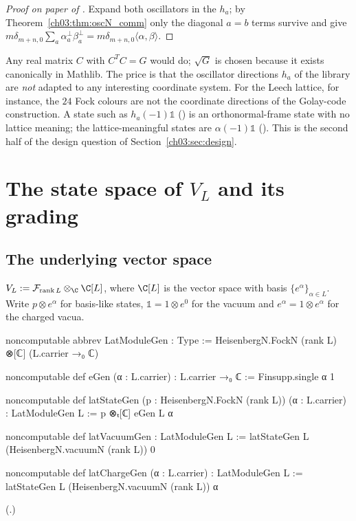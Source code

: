 \begin{proof}[Proof on paper of ]
Expand both oscillators in the $h_a$; by Theorem~\ref{ch03:thm:oscN_comm} only the diagonal
$a=b$ terms survive and give $m\delta_{m+n,0}\sum_a\alpha_a^\perp\beta_a^\perp=m\delta_{m+n,0}
\langle\alpha,\beta\rangle$.
\end{proof}

\begin{remark}\label{ch03:rem:sqrtG}
Any real matrix $C$ with $C^TC=G$ would do; $\sqrt G$ is chosen because it exists canonically in
Mathlib. The price is that the oscillator directions $h_a$ of the library are \emph{not} adapted
to any interesting coordinate system. For the Leech lattice, for instance, the $24$ Fock colours
are not the coordinate directions of the Golay-code construction. A state such as
$h_a(-1)\mathbb 1$ () is an orthonormal-frame state with no lattice meaning; the
lattice-meaningful states are $\alpha(-1)\mathbb 1$ (). This is the second half of the
design question of Section~\ref{ch03:sec:design}.
\end{remark}

\section{The state space of \texorpdfstring{$V_L$}{V\_L} and its grading}\label{ch03:sec:latticespace}

\subsection{The underlying vector space}

\begin{definition}\label{ch03:def:LatModuleGen}
$V_L:=\mathcal F_{\operatorname{rank}L}\otimes_{\C}\C[L]$, where $\C[L]$ is the vector space with
basis $\{e^\alpha\}_{\alpha\in L}$. Write $p\otimes e^\alpha$ for basis-like states, $\mathbb 1=
1\otimes e^0$ for the vacuum and $e^\alpha=1\otimes e^\alpha$ for the charged vacua.
\end{definition}
\begin{leancode}
noncomputable abbrev LatModuleGen : Type :=
  HeisenbergN.FockN (rank L) ⊗[ℂ] (L.carrier →₀ ℂ)

noncomputable def eGen (α : L.carrier) : L.carrier →₀ ℂ := Finsupp.single α 1

noncomputable def latStateGen (p : HeisenbergN.FockN (rank L)) (α : L.carrier) : LatModuleGen L :=
  p ⊗ₜ[ℂ] eGen L α

noncomputable def latVacuumGen : LatModuleGen L :=
  latStateGen L (HeisenbergN.vacuumN (rank L)) 0

noncomputable def latChargeGen (α : L.carrier) : LatModuleGen L :=
  latStateGen L (HeisenbergN.vacuumN (rank L)) α
\end{leancode}
(.)

